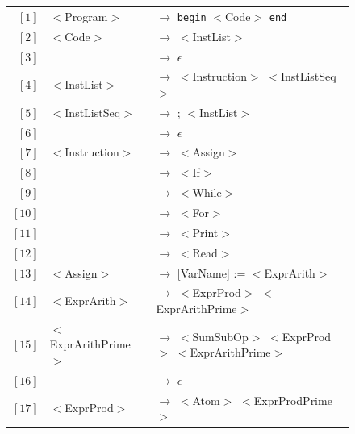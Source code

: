 \documentclass[letterpaper]{article}
\begin{document}
\begin{figure}[H]
    \thispagestyle{empty}

    \begin{center}
            \begin{tabular}{r l l}
                $[1]$ & $<$Program$>$ & $\rightarrow$ \texttt{begin} $<$Code$>$
                \texttt{end} \\

                $[2]$ & $<$Code$>$ & $\rightarrow$ $<$InstList$>$ \\
                $[3]$ & & $\rightarrow$ $\epsilon$ \\

                $[4]$ & $<$InstList$>$ & $\rightarrow$ $<$Instruction$>$
                $<$InstListSeq$>$ \\

                $[5]$ & $<$InstListSeq$>$ & $\rightarrow$ ; $<$InstList$>$ \\
                $[6]$ & & $\rightarrow$ $\epsilon$ \\

                $[7]$ & $<$Instruction$>$ & $\rightarrow$ $<$Assign$>$ \\
                $[8]$ &                   & $\rightarrow$ $<$If$>$ \\
                $[9]$ &                   & $\rightarrow$ $<$While$>$ \\
                $[10]$ &                   & $\rightarrow$ $<$For$>$ \\
                $[11]$ &                   & $\rightarrow$ $<$Print$>$ \\
                $[12]$ &                   & $\rightarrow$ $<$Read$>$ \\

                $[13]$ & $<$Assign$>$ & $\rightarrow$
                 [VarName] := $<$ExprArith$>$  \\

                $[14]$ & $<$ExprArith$>$ & $\rightarrow$
                $<$ExprProd$>$ $<$ExprArithPrime$>$ \\

                $[15]$ & $<$ExprArithPrime$>$ & $\rightarrow$
                $<$SumSubOp$>$ $<$ExprProd$>$ $<$ExprArithPrime$>$ \\
                $[16]$ & & $\rightarrow$ $\epsilon$ \\

                $[17]$ & $<$ExprProd$>$ & $\rightarrow$
                $<$Atom$>$ $<$ExprProdPrime$>$ \\


\end{tabular}
\end{center}
\end{figure}
\end{document}
